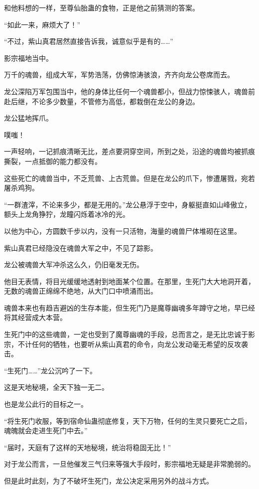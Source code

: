 \begin{this_body}
和他料想的一样，至尊仙胎蛊的食物，正是他之前猜测的答案。

“如此一来，麻烦大了！”

“不过，紫山真君居然直接告诉我，诚意似乎是有的……”

影宗福地当中。

万千的魂兽，组成大军，军势浩荡，仿佛惊涛骇浪，齐齐向龙公卷席而去。

龙公深陷万军包围当中，他的身体比任何一个魂兽都小，但战力惊悚骇人，魂兽前赴后继，不论多少数量，不管修为高低，都栽倒在龙公的身边。

龙公猛地挥爪。

噗嗤！

一声轻响，一记抓痕清晰无比，差点要洞穿空间，所到之处，沿途的魂兽均被抓痕撕裂，一点抵御的能力都没有。

这些死亡的魂兽当中，不乏荒兽、上古荒兽。但是在龙公的爪下，惨遭屠戮，宛若屠杀鸡狗。

“一群渣滓，不论来多少，都是无用的。”龙公悬浮于空中，身躯挺直如山峰傲立，额头上龙角狰狞，龙瞳闪烁着冰冷的光。

以他为中心，方圆数千步以内，没有一只活物，海量的魂兽尸体堆砌在这里。

紫山真君已经隐没在魂兽大军之中，不见了踪影。

龙公被魂兽大军冲杀这么久，仍旧毫发无伤。

他目无表情，将目光缓缓地透射到地面某个位置。在那里，生死门大大地洞开着，无数的魂兽正绵绵不绝地，从大门口中喷涌而出。

魂兽本来也有趋吉避凶的生存本能，但生死门乃是魔尊幽魂多年蹲守之地，早已经将其经营成大本营。

生死门中的这些魂兽，一定也受到了魔尊幽魂的手段，总而言之，是无比忠诚于影宗，不计任何的牺牲，也要听从紫山真君的命令，向龙公发动毫无希望的反攻袭击。

“生死门……”龙公沉吟了一下。

这是天地秘境，全天下独一无二。

也是龙公此行的目标之一。

“将生死门收服，等到宿命仙蛊彻底修复，天下万物，任何的生灵只要死亡之后，魂魄就会走进生死门中去。”

“届时，天庭有了这样的天地秘境，统治将稳固无比！”

对于龙公而言，一旦他催发三气归来等强大手段时，影宗福地无疑是非常脆弱的。

但是此时此刻，为了不破坏生死门，龙公决定采用另外的战斗方式。


\end{this_body}
